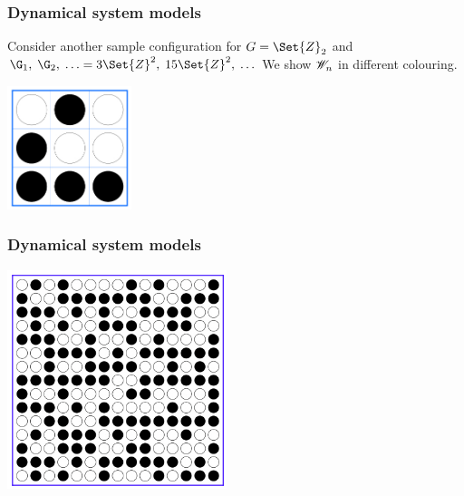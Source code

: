 \begin{frame}
  \frametitle{Dynamical system models}
  
  Consider another sample configuration for $G = \Set{Z}_2$ and 
  $\G_1,\;\G_2,\;\ldots = 3\Set{Z}^2,\; 15\Set{Z}^2,\; \ldots$ 
  We show $\mathscr{W}_n$ in different colouring. 
  
  \begin{center}
   \includegraphics[height=36mm]{pic4.jpg}
  \end{center}
  
\end{frame}


\begin{frame}
  \frametitle{Dynamical system models}
  
  \begin{center}
   \includegraphics[height=64mm]{pic5.jpg}
  \end{center}
  
\end{frame}


